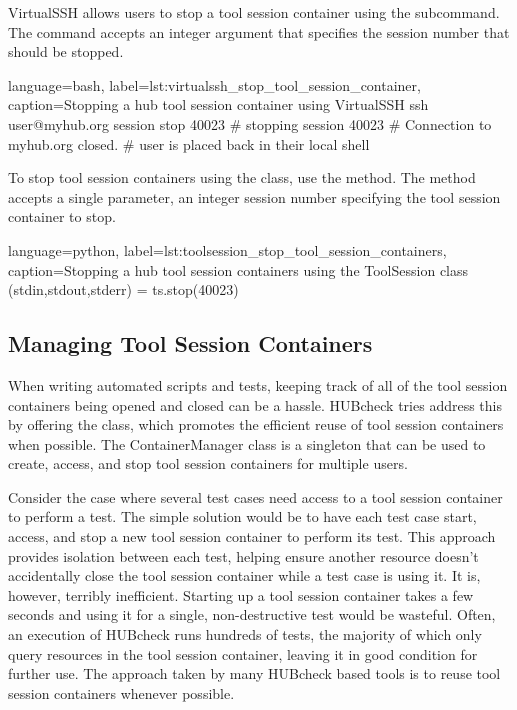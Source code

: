 VirtualSSH allows users to stop a tool session container using the
 subcommand. The command accepts an integer argument that
specifies the session number that should be stopped.

\begin{xcode}{%
  language=bash,%
  label=lst:virtualssh_stop_tool_session_container,%
  caption={Stopping a hub tool session container using VirtualSSH}%
}
ssh user@myhub.org session stop 40023
# stopping session 40023
# Connection to myhub.org closed.
# user is placed back in their local shell
\end{xcode}

To stop tool session containers using the  class, use the
 method. The  method accepts a single
parameter, an integer session number specifying the tool session container to
stop.

\begin{xcode}{%
  language=python,%
  label=lst:toolsession_stop_tool_session_containers,%
  caption={Stopping a hub tool session containers using the ToolSession class}%
}
(stdin,stdout,stderr) = ts.stop(40023)
\end{xcode}


\subsection{Managing Tool Session Containers}
\label{ssec:hubcheck_shell_modules_managing_containers}

When writing automated scripts and tests, keeping track of all of the tool
session containers being opened and closed can be a hassle. HUBcheck tries
address this by offering the  class, which promotes
the efficient reuse of tool session containers when possible. The
ContainerManager class is a singleton that can be used to create, access, and
stop tool session containers for multiple users.

Consider the case where several test cases need access to a tool session
container to perform a test. The simple solution would be to have each test
case start, access, and stop a new tool session container to perform its test.
This approach provides isolation between each test, helping ensure
another resource doesn't accidentally close the tool session container while a
test case is using it. It is, however, terribly inefficient. Starting up a tool session
container takes a few seconds and using it for a single, non-destructive
test would be wasteful. Often, an execution of HUBcheck runs hundreds of tests,
the majority of which only query resources in the tool session container,
leaving it in good condition for further use. The approach taken by many
HUBcheck based tools is to reuse tool session containers whenever possible.

